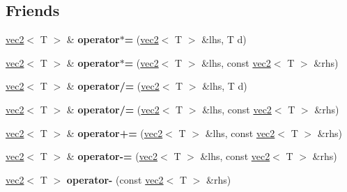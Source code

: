 \subsection*{Friends}
\begin{DoxyCompactItemize}
\item 
\hypertarget{classnv_1_1vec2_a216e425b7f6b4ba8fc4846b251e4fb19}{}\label{classnv_1_1vec2_a216e425b7f6b4ba8fc4846b251e4fb19} 
\hyperlink{classnv_1_1vec2}{vec2}$<$ T $>$ \& {\bfseries operator$\ast$=} (\hyperlink{classnv_1_1vec2}{vec2}$<$ T $>$ \&lhs, T d)
\item 
\hypertarget{classnv_1_1vec2_acfb5953131392ae2ff24e5b9818e7bff}{}\label{classnv_1_1vec2_acfb5953131392ae2ff24e5b9818e7bff} 
\hyperlink{classnv_1_1vec2}{vec2}$<$ T $>$ \& {\bfseries operator$\ast$=} (\hyperlink{classnv_1_1vec2}{vec2}$<$ T $>$ \&lhs, const \hyperlink{classnv_1_1vec2}{vec2}$<$ T $>$ \&rhs)
\item 
\hypertarget{classnv_1_1vec2_ae4010436401845819ae1c987802d08a7}{}\label{classnv_1_1vec2_ae4010436401845819ae1c987802d08a7} 
\hyperlink{classnv_1_1vec2}{vec2}$<$ T $>$ \& {\bfseries operator/=} (\hyperlink{classnv_1_1vec2}{vec2}$<$ T $>$ \&lhs, T d)
\item 
\hypertarget{classnv_1_1vec2_a3939b33baf1bb44242757a4b91ffacdd}{}\label{classnv_1_1vec2_a3939b33baf1bb44242757a4b91ffacdd} 
\hyperlink{classnv_1_1vec2}{vec2}$<$ T $>$ \& {\bfseries operator/=} (\hyperlink{classnv_1_1vec2}{vec2}$<$ T $>$ \&lhs, const \hyperlink{classnv_1_1vec2}{vec2}$<$ T $>$ \&rhs)
\item 
\hypertarget{classnv_1_1vec2_a3af35a75e3ae9f9dddad0fc21747b856}{}\label{classnv_1_1vec2_a3af35a75e3ae9f9dddad0fc21747b856} 
\hyperlink{classnv_1_1vec2}{vec2}$<$ T $>$ \& {\bfseries operator+=} (\hyperlink{classnv_1_1vec2}{vec2}$<$ T $>$ \&lhs, const \hyperlink{classnv_1_1vec2}{vec2}$<$ T $>$ \&rhs)
\item 
\hypertarget{classnv_1_1vec2_a9cffe2e7d8b3f0754685b3d1044471a7}{}\label{classnv_1_1vec2_a9cffe2e7d8b3f0754685b3d1044471a7} 
\hyperlink{classnv_1_1vec2}{vec2}$<$ T $>$ \& {\bfseries operator-\/=} (\hyperlink{classnv_1_1vec2}{vec2}$<$ T $>$ \&lhs, const \hyperlink{classnv_1_1vec2}{vec2}$<$ T $>$ \&rhs)
\item 
\hypertarget{classnv_1_1vec2_a859a796ad57c02d570c28e4cb3f11c1b}{}\label{classnv_1_1vec2_a859a796ad57c02d570c28e4cb3f11c1b} 
\hyperlink{classnv_1_1vec2}{vec2}$<$ T $>$ {\bfseries operator-\/} (const \hyperlink{classnv_1_1vec2}{vec2}$<$ T $>$ \&rhs)
\item 
\hypertarget{classnv_1_1vec2_ae9e8351f127155cf29c8afd8330b005f}{}\label{classnv_1_1vec2_ae9e8351f127155cf29c8afd8330b005f} 

\end{DoxyCompactItemize}
